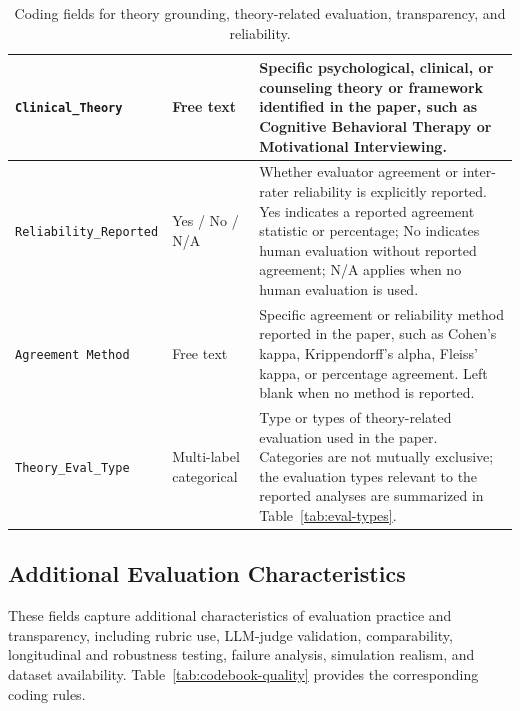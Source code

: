 \begin{table}[p]
\begin{tabular}{p{4.3cm}p{2.5cm}p{8.0cm}}
\texttt{Clinical\_Theory}
&
Free text
&
Specific psychological, clinical, or counseling theory or framework identified in the paper, such as Cognitive Behavioral Therapy or Motivational Interviewing.
\\
\midrule

\texttt{Reliability\_Reported}
&
Yes / No / N/A
&
Whether evaluator agreement or inter-rater reliability is explicitly reported.
Yes indicates a reported agreement statistic or percentage; No indicates human evaluation without reported agreement; N/A applies when no human evaluation is used.
\\
\midrule

\texttt{Agreement Method}
&
Free text
&
Specific agreement or reliability method reported in the paper, such as Cohen's kappa, Krippendorff's alpha, Fleiss' kappa, or percentage agreement. Left blank when no method is reported.
\\
\midrule

\texttt{Theory\_Eval\_Type}
&
Multi-label categorical
&
Type or types of theory-related evaluation used in the paper.
Categories are not mutually exclusive; the evaluation types relevant to the reported analyses are summarized in Table~\ref{tab:eval-types}.
\\

\bottomrule
\end{tabular}
\caption{Coding fields for theory grounding, theory-related evaluation, transparency, and reliability.}
\label{tab:codebook-theory}
\end{table}

\subsection{Additional Evaluation Characteristics}

These fields capture additional characteristics of evaluation practice and transparency, including rubric use, LLM-judge validation, comparability, longitudinal and robustness testing, failure analysis, simulation realism, and dataset availability. 
Table~\ref{tab:codebook-quality} provides the corresponding coding rules.

